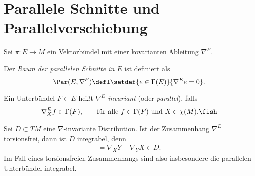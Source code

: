 \documentclass[%
	paper=a5,%
	fleqn,%
	DIV=18,%
	BCOR=0mm,
	fontsize=11pt,
	titlepage=false,%
	bibliography=totoc,
	DIV=18,%
	twoside=true,
	pdftitle=Riemannsche Geometrie,
	pdfauthor=Uwe Semmelmann,
	numbers=noendperiod]%
	{scrbook}
\begin{document}
\section{Parallele Schnitte und Parallelverschiebung}

Sei $\pi\colon E\to M$ ein Vektorbündel mit einer kovarianten Ableitung $\nabla^E$.

\begin{defn}
\begin{defnenum}
\item
Der \emph{Raum der parallelen Schnitte in $E$} ist definiert als
\begin{align*}
\Par(E,\nabla^E) \defl \setdef{e\in \Gamma(E)}{\nabla^E e = 0}.
\end{align*}
\item Ein Unterbündel $F\subset E$ heißt \emph{$\nabla^E$-invariant} (oder
\emph{parallel}), falls
\begin{align*}
\nabla_X^E f \in \Gamma(F),\qquad \text{für alle }f\in \Gamma(F)\text{ und }
X\in\chi(M).\fish
\end{align*}
\end{defnenum}
\end{defn}

\begin{rem}
Sei $D\subset TM$ eine $\nabla$-invariante Distribution. Ist der Zusammenhang
$\nabla^E$ torsionsfrei, dann ist $D$ integrabel, denn
\begin{align*}
[X,Y] = \nabla_X Y - \nabla_Y X \in D.
\end{align*}
Im Fall eines torsionsfreien Zusammenhangs sind also insbesondere die parallelen Unterbündel integrabel.\map
\end{rem}
\end{document}

